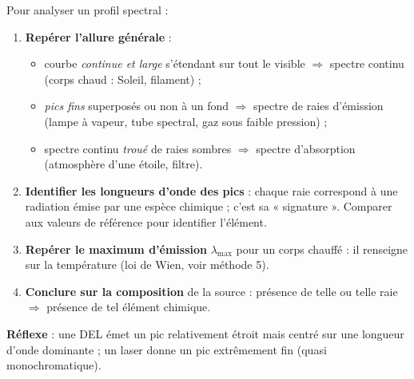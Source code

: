 \documentclass[11pt]{article}
\begin{document}
\begin{methode}
Pour analyser un profil spectral :
\begin{enumerate}
\item \textbf{Repérer l'allure générale} :
\begin{itemize}
\item courbe \emph{continue et large} s'étendant sur tout le visible $\Rightarrow$ spectre continu (corps chaud : Soleil, filament) ;
\item \emph{pics fins} superposés ou non à un fond $\Rightarrow$ spectre de raies d'émission (lampe à vapeur, tube spectral, gaz sous faible pression) ;
\item spectre continu \emph{troué} de raies sombres $\Rightarrow$ spectre d'absorption (atmosphère d'une étoile, filtre).
\end{itemize}
\item \textbf{Identifier les longueurs d'onde des pics} : chaque raie correspond à une radiation émise par une espèce chimique ; c'est sa « signature ». Comparer aux valeurs de référence pour identifier l'élément.
\item \textbf{Repérer le maximum d'émission} $\lambda_{\max}$ pour un corps chauffé : il renseigne sur la température (loi de Wien, voir méthode 5).
\item \textbf{Conclure sur la composition} de la source : présence de telle ou telle raie $\Rightarrow$ présence de tel élément chimique.
\end{enumerate}
\textbf{Réflexe} : une DEL émet un pic relativement étroit mais centré sur une longueur d'onde dominante ; un laser donne un pic extrêmement fin (quasi monochromatique).
\end{methode}
\end{document}
